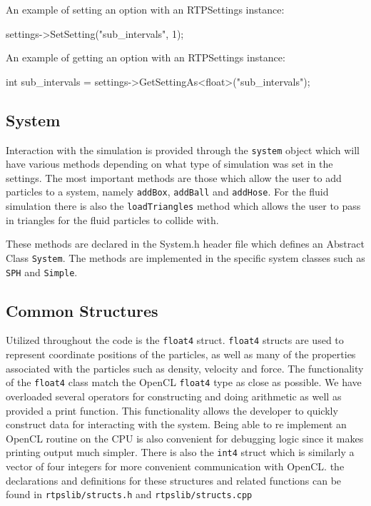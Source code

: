 An example of setting an option with an RTPSettings instance:
\begin{cppcode}{0}
settings->SetSetting("sub_intervals", 1);
\end{cppcode}

An example of getting an option with an RTPSettings instance:
\begin{cppcode}{0}
int sub_intervals =  settings->GetSettingAs<float>("sub_intervals");
\end{cppcode}

\subsection{System}

Interaction with the simulation is provided through the \verb|system| object which
will have various methods depending on what type of simulation was set in the
settings. The most important methods are those which allow the user to add
particles to a system, namely \verb|addBox|, \verb|addBall| and \verb|addHose|. For the fluid
simulation there is also the \verb|loadTriangles| method which allows the user to
pass in triangles for the fluid particles to collide with.

These methods are declared in the System.h header file which defines an
Abstract Class \verb|System|. The methods are implemented in the specific system
classes such as \verb|SPH| and \verb|Simple|.

\subsection{Common Structures}

Utilized throughout the code is the \verb|float4| struct. \verb|float4| structs are used
to represent coordinate positions of the particles, as well as many of the
properties associated with the particles such as density, velocity and force.
The functionality of the \verb|float4| class match the OpenCL \verb|float4| type as close
as possible. We have overloaded several operators for constructing and doing
arithmetic as well as provided a print function. This functionality allows the
developer to quickly construct data for interacting with the system. Being able
to re implement an OpenCL routine on the CPU is also convenient for debugging
logic since it makes printing output much simpler. 
There is also the \verb|int4| struct which is similarly a vector of four integers
for more convenient communication with OpenCL.
the declarations and definitions for these structures and related functions can
be found in \verb|rtpslib/structs.h| and \verb|rtpslib/structs.cpp|


